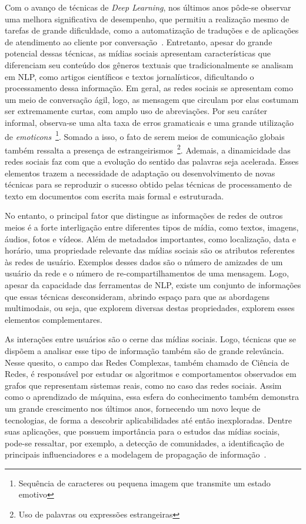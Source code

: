Com o avanço de técnicas de \textit{Deep Learning}, nos últimos anos pôde-se
observar uma melhora significativa de desempenho, que permitiu a realização mesmo
de tarefas de grande dificuldade, como a automatização de traduções e de aplicações
de atendimento ao cliente por conversação~\cite{hirschberg15}.
Entretanto, apesar do grande potencial dessas técnicas, as mídias sociais
apresentam características que diferenciam seu conteúdo dos gêneros textuais que
tradicionalmente se analisam em NLP, como artigos científicos e textos
jornalísticos, dificultando o processamento dessa informação.
Em geral, as redes sociais se apresentam como um meio de conversação ágil, logo,
as mensagem que circulam por elas costumam ser extremamente curtas, com amplo
uso de abreviações.
Por seu caráter informal, observa-se uma alta taxa de erros gramaticais e
uma grande utilização de \textit{emoticons}~\footnote{Sequência de caracteres ou
pequena imagem que transmite um estado emotivo}.
Somado a isso, o fato de serem meios de comunicação globais também ressalta a
presença de estrangeirismos~\footnote{Uso de palavras ou expressões estrangeiras}.
Ademais, a dinamicidade das redes sociais faz com que a evolução do sentido das
palavras seja acelerada.
Esses elementos trazem a necessidade de adaptação ou desenvolvimento de novas
técnicas para se reproduzir o sucesso obtido pelas técnicas de processamento de
texto em documentos com escrita mais formal e estruturada.

No entanto, o principal fator que distingue as informações de redes de outros
meios é a forte interligação entre diferentes tipos de mídia, como textos, imagens,
áudios, fotos e vídeos.
Além de metadados importantes, como localização, data e horário, uma propriedade
relevante das mídias sociais são os atributos referentes às redes de usuário.
Exemplos desses dados são o número de amizades de um usuário da rede e o
número de re-compartilhamentos de uma mensagem.
Logo, apesar da capacidade das ferramentas de NLP, existe um conjunto de
informações que essas técnicas desconsideram, abrindo espaço para que as
abordagens multimodais, ou seja, que explorem diversas destas propriedades,
explorem esses elementos complementares.

As interações entre usuários são o cerne das mídias sociais.
Logo, técnicas que se dispõem a analisar esse tipo de informação também são de
grande relevância.
Nesse quesito, o campo das Redes Complexas, também chamado de Ciência de Redes,
é responsável por estudar os algoritmos e comportamentos observados em grafos
que representam sistemas reais, como no caso das redes sociais.
Assim como o aprendizado de máquina, essa esfera do conhecimento também
demonstra um grande crescimento nos últimos anos, fornecendo um novo leque de
tecnologias, de forma a descobrir aplicabilidades até então inexploradas.
Dentre suas aplicações, que possuem importância para o estudos das mídias
sociais, pode-se ressaltar, por exemplo, a detecção de comunidades, a
identificação de principais influenciadores e a modelagem de propagação de
informação~\cite{barabasi16}.

